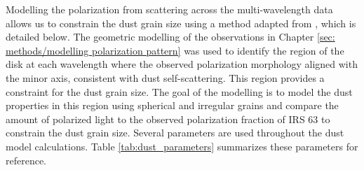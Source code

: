 





Modelling the polarization from scattering across the multi-wavelength data allows us to constrain the dust grain size using a method adapted from \cite{Zhang2023}, which is detailed below. The geometric modelling of the observations in Chapter \ref{sec: methods/modelling polarization pattern} was used to identify the region of the disk at each wavelength where the observed polarization morphology aligned with the minor axis, consistent with dust self-scattering. This region provides a constraint for the dust grain size. The goal of the modelling is to model the dust properties in this region using spherical and irregular grains and compare the amount of polarized light to the observed polarization fraction of IRS 63 to constrain the dust grain size. Several parameters are used throughout the dust model calculations. Table \ref{tab:dust_parameters} summarizes these parameters for reference. 










